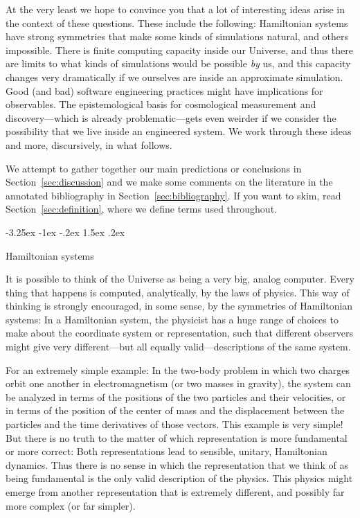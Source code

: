 \documentclass[letterpaper]{article}
\makeatletter
\renewcommand\section{\@startsection {section}{1}{\z@}%
  {-3.25ex \@plus -1ex \@minus -.2ex}%
  {1.5ex \@plus .2ex}%
  {\raggedright\normalfont\large\bfseries}}
\newcommand{\sectionname}{Section}
\newcommand{\secref}[1]{\sectionname~\ref{#1}}
\makeatother
\begin{document}
At the very least we hope to convince you that a lot of interesting ideas arise in the context of these questions.
These include the following:
Hamiltonian systems have strong symmetries that make some kinds of simulations natural, and others impossible.
There is finite computing capacity inside our Universe, and thus there are limits to what kinds of simulations would be possible \emph{by} us, and this capacity changes very dramatically if we ourselves are inside an approximate simulation.
Good (and bad) software engineering practices might have implications for observables.
The epistemological basis for cosmological measurement and discovery---which is already problematic---gets even weirder if we consider the possibility that we live inside an engineered system.
We work through these ideas and more, discursively, in what follows.

We attempt to gather together our main predictions or conclusions in \secref{sec:discussion} and we make some comments on the literature in the annotated bibliography in \secref{sec:bibliography}.
If you want to skim, read \sectionname~\ref{sec:definition}, where we define terms used throughout.

\section{Hamiltonian systems}

It is possible to think of the Universe as being a very big, analog computer.
Every thing that happens is computed, analytically, by the laws of physics.
This way of thinking is strongly encouraged, in some sense, by the symmetries of Hamiltonian systems:
In a Hamiltonian system, the physicist has a huge range of choices to make about the coordinate system or representation, such that different observers might give very different---but all equally valid---descriptions of the same system.

For an extremely simple example: In the two-body problem in which two charges orbit one another in electromagnetism (or two masses in gravity), the system can be analyzed in terms of the positions of the two particles and their velocities, or in terms of the position of the center of mass and the displacement between the particles and the time derivatives of those vectors.
This example is very simple!
But there is no truth to the matter of which representation is more fundamental or more correct:
Both representations lead to sensible, unitary, Hamiltonian dynamics.
Thus there is no sense in which the representation that we think of as being fundamental is the only valid description of the physics.
This physics might emerge from another representation that is extremely different, and possibly far more complex (or far simpler).
\end{document}
